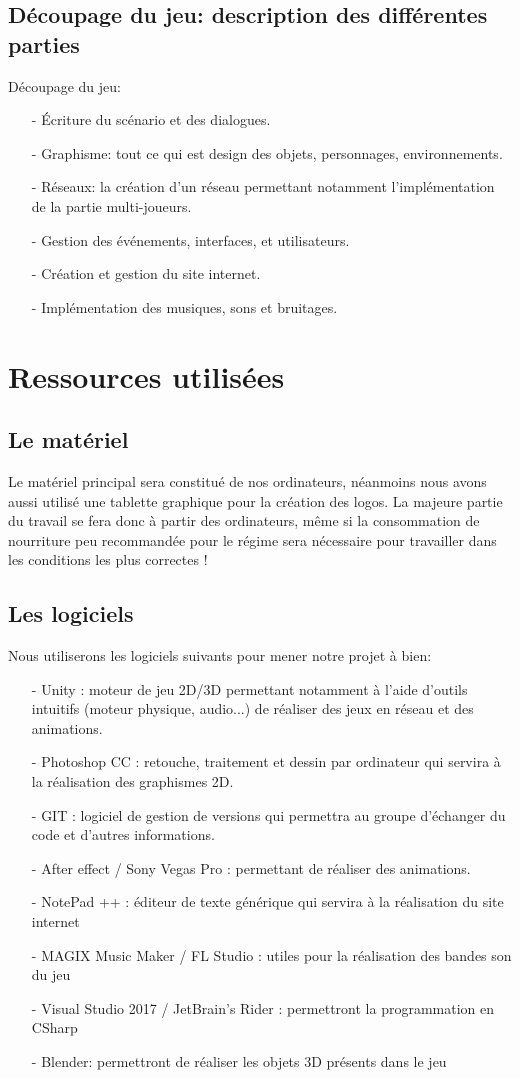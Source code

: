 \documentclass[12pt,a4paper]{article}
\begin{document}
\subsection{Découpage du jeu: description des différentes \newline parties}
Découpage du jeu:
\begin{itemize}
\item[-] Écriture du scénario et des dialogues.
\item[-] Graphisme: tout ce qui est design des objets, personnages, environnements.
\item[-] Réseaux: la création d'un réseau permettant notamment l'implémentation de la partie multi-joueurs.
\item[-] Gestion des événements, interfaces, et utilisateurs.
\item[-] Création et gestion du site internet.
\item[-] Implémentation des musiques, sons et bruitages.
\end{itemize}

\newpage
\section{Ressources utilisées}
\subsection{Le matériel}
Le matériel principal sera constitué de nos ordinateurs, néanmoins nous avons aussi utilisé une tablette graphique
pour la création des logos.
La majeure partie du travail se fera donc à partir des ordinateurs, même si la consommation de nourriture
peu recommandée pour le régime sera nécessaire pour travailler dans les conditions les plus correctes !
\subsection{Les logiciels}
Nous utiliserons les logiciels suivants pour mener notre projet à bien:
\begin{itemize}
\item[-] Unity : moteur de jeu 2D/3D permettant notamment à l'aide d'outils
intuitifs (moteur physique, audio...) de réaliser des jeux en réseau et
des animations.
\item[-] Photoshop CC : retouche, traitement et dessin par
ordinateur qui servira à la réalisation des graphismes 2D.
\item[-] GIT : logiciel de gestion de versions qui permettra au groupe d'échanger du code et d’autres informations.
\item[-] After effect / Sony Vegas Pro : permettant de réaliser des animations.
\item[-] NotePad ++ : éditeur de texte générique qui servira à la réalisation
du site internet
\item[-] MAGIX Music Maker / FL Studio : utiles pour la
réalisation des bandes son du jeu
\item[-] Visual Studio 2017 / JetBrain's Rider : permettront la programmation en CSharp
\item[-] Blender: permettront de réaliser les objets 3D présents dans le jeu
\end{itemize}
\end{document}

